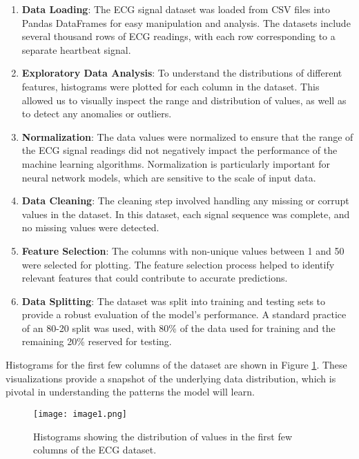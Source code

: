 \documentclass{report}
\begin{document}
\begin{enumerate}
    \item \textbf{Data Loading}: The ECG signal dataset was loaded from CSV files into Pandas DataFrames for easy manipulation and analysis. The datasets include several thousand rows of ECG readings, with each row corresponding to a separate heartbeat signal.
    \item \textbf{Exploratory Data Analysis}: To understand the distributions of different features, histograms were plotted for each column in the dataset. This allowed us to visually inspect the range and distribution of values, as well as to detect any anomalies or outliers.
    \item \textbf{Normalization}: The data values were normalized to ensure that the range of the ECG signal readings did not negatively impact the performance of the machine learning algorithms. Normalization is particularly important for neural network models, which are sensitive to the scale of input data.
    \item \textbf{Data Cleaning}: The cleaning step involved handling any missing or corrupt values in the dataset. In this dataset, each signal sequence was complete, and no missing values were detected.
    \item \textbf{Feature Selection}: The columns with non-unique values between 1 and 50 were selected for plotting. The feature selection process helped to identify relevant features that could contribute to accurate predictions.
    \item \textbf{Data Splitting}: The dataset was split into training and testing sets to provide a robust evaluation of the model's performance. A standard practice of an 80-20 split was used, with 80\% of the data used for training and the remaining 20\% reserved for testing.
\end{enumerate}

Histograms for the first few columns of the dataset are shown in Figure \ref{fig:histograms}. These visualizations provide a snapshot of the underlying data distribution, which is pivotal in understanding the patterns the model will learn.

\begin{figure}[ht]
    \centering
    \texttt{[image: image1.png]} %
    \caption{Histograms showing the distribution of values in the first few columns of the ECG dataset.}
    \label{fig:histograms}
\end{figure}
\end{document}
